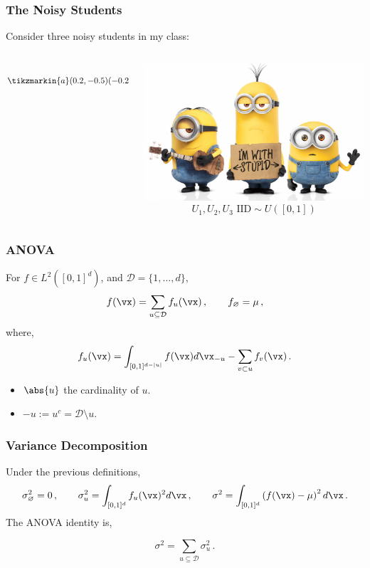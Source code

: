 \documentclass[11pt,compress]{beamer} %
\newcommand{\e}{\text{e}}
\begin{document}
\begin{frame}
\frametitle{The Noisy Students}
Consider three noisy students in my class:
\begin{columns}
  \begin{column}{.45\textwidth}
  \center
  \vspace{-.5cm}
	\begin{equation*}
	\tikzmarkin{a}(0.2,-0.5)(-0.2,1.25)
	\overbrace{f(U_1,U_2,U_3)=\e^{3/2U_1+U_2}+\cos(2\pi U_3)}^{\text{Noise Model}}
	\tikzmarkend{a}
	\end{equation*}
  \end{column}
  \begin{column}{.45\textwidth}
  \center
    \includegraphics[width=.75\textwidth]{minions.jpg}
  	\[U_1,U_2,U_3 \text{ IID}\sim U([0,1])\]
  \end{column}
\end{columns}

\end{frame}

\begin{frame}
\frametitle{ANOVA}
For $f\in L^2\left([0,1]^d\right)$, and $\mathcal{D}=\{1,\dots,d\}$,
\begin{equation*}
f(\vx)=\sum \limits_{u \subseteq \mathcal{D}} f_u(\vx)\, , \qquad f_{\varnothing} = \mu\, ,
\label{anova}
\end{equation*}
where,
\[f_u(\vx)= \int_{[0,1]^{d-|u|}} f(\vx) d{\vx}_{-u} - \sum \limits_{v \subset u} f_v(\vx)\, .\]

\begin{itemize}
\item $\abs{u}$ the cardinality of $u$.
\item $-u:=u^c=\mathcal{D}\setminus u$.
\end{itemize}
\end{frame}

\begin{frame}
\frametitle{Variance Decomposition}
Under the previous definitions,
\begin{equation*}
\sigma^2_{\varnothing} = 0\, ,\qquad \sigma^2_{u} =\int_{[0,1]^{d}} f_u(\vx)^2 d{\vx}\, ,\qquad \sigma^2 =\int_{[0,1]^{d}} \left(f(\vx)-\mu\right)^2 d{\vx}\, .
\end{equation*}
The ANOVA identity is,

\[
\sigma^2 = \sum \limits_{u \subseteq\mathcal{D}} \sigma_u^2 \, .
\]
\end{frame}
\end{document}
